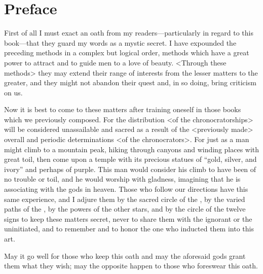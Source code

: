\section{Preface}
First of all I must exact an oath from my readers—particularly in regard to this book—that they guard my words as a mystic secret. I have expounded the preceding methods in a complex but logical order,
methods which have a great power to attract and to guide men to a love of beauty. <Through these methods> they may extend their range of interests from the lesser matters to the greater, and they might not abandon their quest and, in so doing, bring criticism on us. 

Now it is best to come to these matters after training oneself in those books which we previously composed. For the distribution <of the
chronocratorships> will be considered unassailable and sacred as a result of the <previously made> overall and periodic determinations <of the chronocrators>. For just as a man might climb to a mountain peak, hiking through canyons and winding places with great toil, then come upon a temple with its precious statues of “gold, silver, and ivory” and perhaps of purple. This man would consider his climb to have been of no trouble or toil, and he would worship with gladness, imagining that he is associating with the gods in heaven. Those who follow our directions have this same experience, and I adjure them by the sacred circle of the \Sun, by the varied paths of the \Moon, by the powers of the other stars, and by the circle of the
twelve signs to keep these matters secret, never to share them with the ignorant or the uninitiated, and to remember and to honor the one who inducted them into this art. 

May it go well for those who keep this oath and may the aforesaid gods grant them what they wish; may the opposite happen to those who foreswear this oath.

\newpage